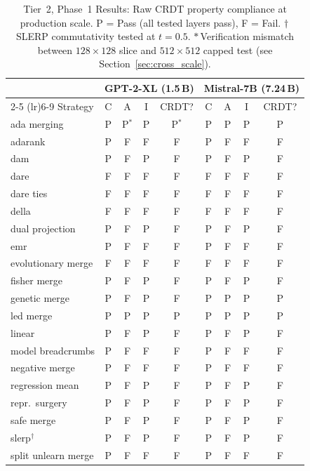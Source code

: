 \documentclass[10pt,letterpaper]{article}
\begin{document}
\begin{table}[t]
\centering
\caption{Tier~2, Phase~1 Results: Raw CRDT property compliance at production scale. P = Pass (all tested layers pass), F = Fail. $\dagger$\,SLERP commutativity tested at $t=0.5$. $\ast$\,Verification mismatch between $128\times 128$ slice and $512\times 512$ capped test (see Section~\ref{sec:cross_scale}).}
\label{tab:phase1_production}
\small
\begin{tabular}{l ccc c ccc c}
\toprule
& \multicolumn{4}{c}{GPT-2-XL (1.5\,B)} & \multicolumn{4}{c}{Mistral-7B (7.24\,B)} \\
\cmidrule(lr){2-5} \cmidrule(lr){6-9}
Strategy & C & A & I & CRDT? & C & A & I & CRDT? \\
\midrule
ada merging         & P & P$^{\ast}$ & P & P$^{\ast}$ & P & P & P & P \\
adarank             & P & F & F & F & P & F & F & F \\
dam                 & P & F & P & F & P & F & P & F \\
dare                & F & F & F & F & F & F & F & F \\
dare ties           & F & F & F & F & F & F & F & F \\
della               & F & F & F & F & F & F & F & F \\
dual projection     & P & F & P & F & P & F & P & F \\
emr                 & P & F & F & F & P & F & F & F \\
evolutionary merge  & F & F & F & F & F & F & F & F \\
fisher merge        & P & F & P & F & P & F & P & F \\
genetic merge       & P & F & P & F & P & P & P & P \\
led merge           & P & P & P & P & P & P & P & P \\
linear              & P & F & P & F & P & F & P & F \\
model breadcrumbs   & P & F & F & F & P & F & F & F \\
negative merge      & P & F & F & F & P & F & F & F \\
regression mean     & P & F & P & F & P & F & P & F \\
repr.\ surgery      & P & F & P & F & P & F & P & F \\
safe merge          & P & F & P & F & P & F & P & F \\
slerp$^{\dagger}$   & P & F & P & F & P & F & P & F \\
split unlearn merge & P & F & F & F & P & F & F & F \\

\end{tabular}
\end{table}
\end{document}
